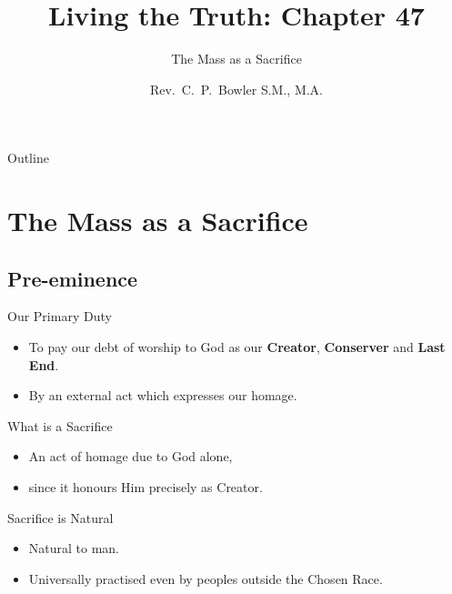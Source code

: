 \documentclass{beamer}
\title[Living the Truth 47] %
{Living the Truth: Chapter 47}
\subtitle
{The Mass as a Sacrifice} %
\author{Rev.~C.~P.~Bowler S.M., M.A.}
\begin{document}
\begin{frame}
  \titlepage
\end{frame}

\begin{frame}{Outline}
  \tableofcontents
\end{frame}




\section{The Mass as a Sacrifice}

\subsection{Pre-eminence}

\begin{frame}{Our Primary Duty}
\begin{itemize}
\item To pay our debt of worship to God as our \textbf{Creator}, \textbf{Conserver} and  
\textbf{Last End}.
\item By an external act which expresses our homage.
\end{itemize}
\end{frame}


\begin{frame}{What is a Sacrifice}
\begin{itemize}
\item An act of homage due to God alone, 
\item since it honours Him  precisely    as Creator.
\end{itemize}
\end{frame}

\begin{frame}{Sacrifice is Natural}
\begin{itemize}
\item Natural to man. 
\item Universally practised even by peoples outside  the
    Chosen Race.
\end{itemize}
\end{frame}
\end{document}
